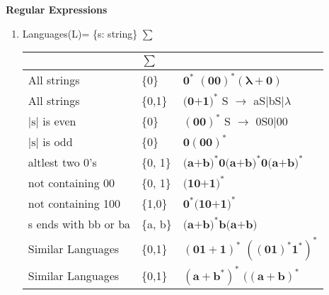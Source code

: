 
\centerline{\textbf{ \LARGE Regular Expressions }}

\begin{enumerate}
    \item Languages(L)= \{s: string\} \(\sum\)

    \begin{myTableStyle} \begin{tabular}{ |m{4cm}|m{1cm}|m{10cm}| } \hline
        & \(\sum\) & \\ \hline
        All strings  &\{0\}
                     & \( \mathbf {0^*} \)  \quad \( \mathbf {(00)^*(\lambda+0)} \)  \\ \hline

        All strings &\{0,1\}
                    & \( \mathbf {\text{(0+1)}^*} \)   \quad S \(\rightarrow\) aS\(|\)bS\(| \lambda \) \\ \hline

         \(\left |\text{s}\right | \)  is even & \{0\}
                        &  \( \mathbf {(00)^*} \) \quad S \(\rightarrow\) 0S0\(|\)00 \\ \hline

        \(   \left | \text{s}  \right | \)  is odd & \{0\} &  \( \mathbf {0(00)^*} \) \\ \hline

        altlest two 0's & \{0, 1\}
                & \( \mathbf { \text{(a+b)}^* \text{0} \text{(a+b)}^* \text{0} \text{(a+b)}^*} \) \\ \hline

        not containing 00 & \{0, 1\} &  \( \mathbf { \text{(10+1)}^* } \)  \\ \hline

        not containing 100 & \{1,0\}
                                      & \( \mathbf { \text{0}^*\text{(10+1)}^* } \) \\\hline

        s ends with bb or ba & \{a, b\}
                             & \( \mathbf { \text{(a+b)}^* \text{b} \text{(a+b)} } \)  \\\hline

        Similar Languages  &\{0,1\}
                           & \( \mathbf {(01 + 1)^*} \) \quad \( \mathbf {((01)^*1^*)^*} \) \\ \hline

        Similar Languages  &\{0,1\}
                           & \( \mathbf {(a + b^*)^*} \) \quad \( \mathbf {((a+b)^*} \) \\ \hline

    \end{tabular} \end{myTableStyle} \vspace{0.08in}


\end{enumerate}
